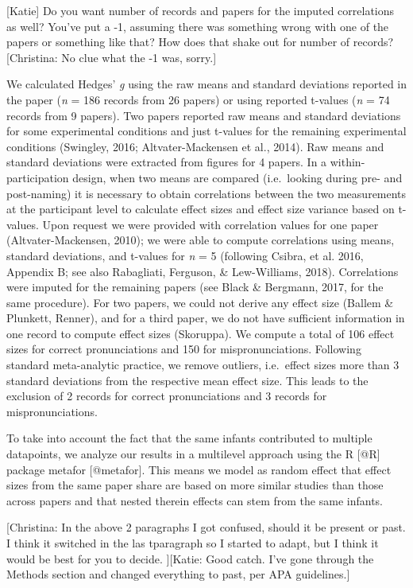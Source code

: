 \documentclass[man]{apa6}
\theoremstyle{definition}
\theoremstyle{definition}
\theoremstyle{definition}
\theoremstyle{remark}
\begin{document}
{[}Katie{]} Do you want number of records and papers for the imputed
correlations as well? You've put a -1, assuming there was something
wrong with one of the papers or something like that? How does that shake
out for number of records? {[}Christina: No clue what the -1 was,
sorry.{]}

We calculated Hedges' \emph{g} using the raw means and standard
deviations reported in the paper (\emph{n} = 186 records from 26 papers)
or using reported t-values (\emph{n} = 74 records from 9 papers). Two
papers reported raw means and standard deviations for some experimental
conditions and just t-values for the remaining experimental conditions
(Swingley, 2016; Altvater-Mackensen et al., 2014). Raw means and
standard deviations were extracted from figures for 4 papers. In a
within-participation design, when two means are compared (i.e.~looking
during pre- and post-naming) it is necessary to obtain correlations
between the two measurements at the participant level to calculate
effect sizes and effect size variance based on t-values. Upon request we
were provided with correlation values for one paper (Altvater-Mackensen,
2010); we were able to compute correlations using means, standard
deviations, and t-values for \emph{n} = 5 (following Csibra, et al.
2016, Appendix B; see also Rabagliati, Ferguson, \& Lew-Williams, 2018).
Correlations were imputed for the remaining papers (see Black \&
Bergmann, 2017, for the same procedure). For two papers, we could not
derive any effect size (Ballem \& Plunkett, Renner), and for a third
paper, we do not have sufficient information in one record to compute
effect sizes (Skoruppa). We compute a total of 106 effect sizes for
correct pronunciations and 150 for mispronunciations. Following standard
meta-analytic practice, we remove outliers, i.e.~effect sizes more than
3 standard deviations from the respective mean effect size. This leads
to the exclusion of 2 records for correct pronunciations and 3 records
for mispronunciations.

To take into account the fact that the same infants contributed to
multiple datapoints, we analyze our results in a multilevel approach
using the R {[}@R{]} package metafor {[}@metafor{]}. This means we model
as random effect that effect sizes from the same paper share are based
on more similar studies than those across papers and that nested therein
effects can stem from the same infants.

{[}Christina: In the above 2 paragraphs I got confused, should it be
present or past. I think it switched in the las tparagraph so I started
to adapt, but I think it would be best for you to decide. {]}{[}Katie:
Good catch. I've gone through the Methods section and changed everything
to past, per APA guidelines.{]}
\end{document}
